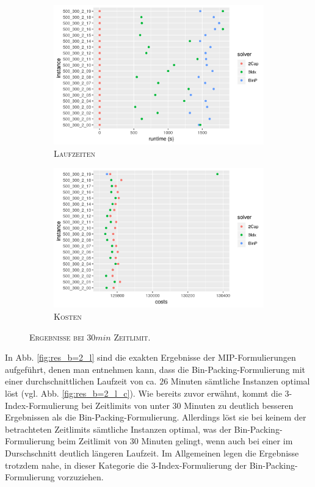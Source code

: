 \begin{figure}[H]
\centering
\begin{subfigure}[b]{0.4\textwidth}
\centering
\includegraphics[width=1.3\textwidth]{img/solver_instance_time_b=2_l_1800s.png}
\caption{\textsc{Laufzeiten}}
\label{fig:b=2_l_runtimes}
\end{subfigure}
\hfill
\begin{subfigure}[b]{0.4\textwidth}
\centering
\includegraphics[width=1.3\textwidth]{img/solver_instance_cost_b=2_l_1800s.png}
\caption{\textsc{Kosten}}
\label{fig:b=2_l_costs}
\end{subfigure}
\caption{\textsc{Ergebnisse bei $30min$ Zeitlimit}.}
\label{fig:res_plots_b=2_l}
\end{figure}

In Abb. \ref{fig:res_b=2_l} sind die exakten Ergebnisse der MIP-Formulierungen aufgeführt, denen man
entnehmen kann, dass die Bin-Packing-Formulierung mit einer durchschnittlichen Laufzeit von ca. $26$ Minuten sämtliche Instanzen
optimal löst (vgl. Abb. \ref{fig:res_b=2_l_c}). Wie bereits zuvor erwähnt, kommt die 3-Index-Formulierung bei Zeitlimits von unter $30$ Minuten zu deutlich besseren Ergebnissen als die Bin-Packing-Formulierung. Allerdings löst sie bei keinem der betrachteten Zeitlimits sämtliche Instanzen optimal, was der Bin-Packing-Formulierung beim Zeitlimit von $30$ Minuten gelingt, wenn auch bei einer im Durschschnitt deutlich längeren Laufzeit. Im Allgemeinen legen die Ergebnisse trotzdem nahe, in dieser Kategorie die 3-Index-Formulierung der Bin-Packing-Formulierung vorzuziehen.

